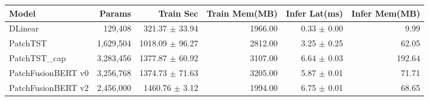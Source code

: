 \begin{tabular}{lrrrrr}
\toprule
Model & Params & Train Sec & Train Mem(MB) & Infer Lat(ms) & Infer Mem(MB) \\
\midrule
DLinear & 129,408 & 321.37 $\pm$ 33.94 & 1966.00 & 0.33 $\pm$ 0.00 & 9.99 \\
PatchTST & 1,629,504 & 1018.09 $\pm$ 96.27 & 2812.00 & 3.25 $\pm$ 0.25 & 62.05 \\
PatchTST_cap & 3,283,456 & 1377.87 $\pm$ 60.92 & 3107.00 & 6.64 $\pm$ 0.03 & 192.64 \\
PatchFusionBERT v0 & 3,256,768 & 1374.73 $\pm$ 71.63 & 3205.00 & 5.87 $\pm$ 0.01 & 71.71 \\
PatchFusionBERT v2 & 2,456,000 & 1460.76 $\pm$ 3.12 & 1994.00 & 6.75 $\pm$ 0.01 & 68.65 \\
\bottomrule
\end{tabular}

